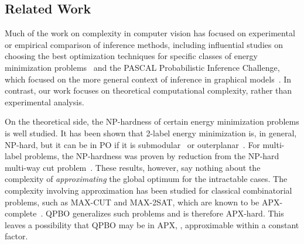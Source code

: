 \subsection{Related Work}\label{sec:related}

%

Much of the work on complexity in computer vision has focused on experimental or empirical comparison of inference methods, including influential studies on choosing the best optimization techniques for specific classes of energy minimization problems~\cite{Szeliski08-PAMI,kappes2015comparative} and the PASCAL Probabilistic Inference Challenge, which focused on the more general context of inference in graphical models~\cite{PIC}. In contrast, our work focuses on theoretical computational complexity, rather than experimental analysis.

On the theoretical side, the NP-hardness of certain energy minimization problems is well studied. It has been shown that 2-label energy minimization is, in general, NP-hard, but it can be in PO if it is submodular~\cite{Kolmogorov02:regular-pami} or outerplanar~\cite{Schraudolph-10}. For multi-label problems, the NP-hardness was proven by reduction from the NP-hard multi-way cut problem~\cite{boykov2001approximate}. These results, however, say nothing about the complexity of {\em approximating} the global optimum for the intractable cases. The complexity involving approximation has been studied for classical combinatorial problems, such as MAX-CUT and MAX-2SAT, which are known to be APX-complete~\cite{Papadimitriou-91}. QPBO generalizes such problems and is therefore APX-hard. This leaves a possibility that QPBO may be in APX, \ie, approximable within a constant factor.



